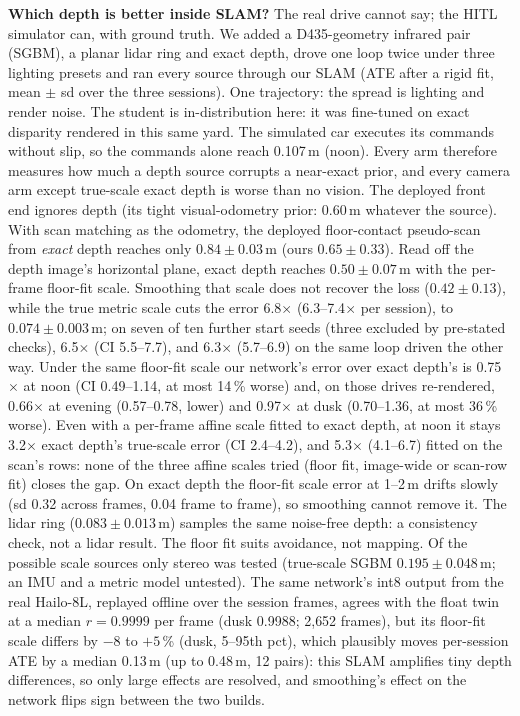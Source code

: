 \documentclass[conference]{IEEEtran}
\newcommand{\hailo}{Hailo-8L}
\begin{document}
\textbf{Which depth is better inside SLAM?} The real drive cannot say; the HITL simulator can, with ground truth. We added a
D435-geometry infrared pair (SGBM), a planar lidar ring and exact depth, drove one loop twice under three lighting presets and ran
every source through our SLAM (ATE after a rigid fit, mean $\pm$ sd over the three sessions). One trajectory:
the spread is lighting and render noise. The student is in-distribution here: it
was fine-tuned on exact disparity rendered in this same yard. The simulated car executes its commands without slip, so the
commands alone reach 0.107\,m (noon). Every arm therefore measures how much a depth source corrupts
a near-exact prior, and every camera arm except true-scale exact depth is worse than no vision. The deployed front end ignores depth (its tight visual-odometry prior: 0.60\,m whatever the source). With scan
matching as the odometry, the deployed floor-contact pseudo-scan from \emph{exact} depth reaches only $0.84\pm0.03$\,m (ours
$0.65\pm0.33$). Read off the depth image's horizontal plane, exact depth reaches $0.50\pm0.07$\,m with the per-frame floor-fit
scale. Smoothing that scale does not recover the loss ($0.42\pm0.13$), while the true metric
scale cuts the error 6.8$\times$ (6.3--7.4$\times$ per session), to $\mathbf{0.074\pm0.003}$\,m; on seven of ten further start seeds (three excluded by pre-stated checks), 6.5$\times$ (CI 5.5--7.7), and 6.3$\times$ (5.7--6.9) on the same loop driven the other way. Under the same floor-fit scale our network's error over exact depth's is
0.75$\times$ at noon (CI 0.49--1.14, at most 14\,\% worse) and, on those drives re-rendered, 0.66$\times$ at evening (0.57--0.78, lower) and 0.97$\times$ at dusk (0.70--1.36, at most 36\,\% worse). Even with a per-frame affine scale fitted to exact depth, at noon it stays 3.2$\times$ exact depth's true-scale error (CI 2.4--4.2), and 5.3$\times$ (4.1--6.7) fitted on the scan's rows: none of the three affine scales tried (floor fit, image-wide or scan-row fit) closes the gap. On exact depth the floor-fit scale error at 1--2\,m drifts slowly (sd 0.32 across frames, 0.04 frame to frame), so
smoothing cannot remove it. The lidar ring ($0.083\pm0.013$\,m) samples the same noise-free depth: a consistency check, not a lidar result. The floor fit suits avoidance, not mapping. Of the possible scale sources only stereo was
tested (true-scale SGBM $0.195\pm0.048$\,m; an IMU and a metric model untested). The
same network's int8 output from the real \hailo{}, replayed offline over the session frames, agrees with the float twin at a median
$r=0.9999$ per frame (dusk 0.9988; 2{,}652 frames), but its floor-fit scale differs by $-8$ to $+5$\,\% (dusk, 5--95th pct), which plausibly moves per-session ATE by a median 0.13\,m (up to 0.48\,m, 12 pairs): this SLAM amplifies tiny depth
differences, so only large effects are resolved, and smoothing's effect on the network flips sign between the two builds.
\end{document}
